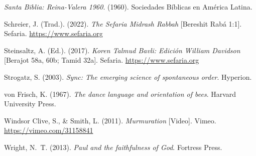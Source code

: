 \documentclass[11pt,letterpaper]{article}
\newcommand{\refapa}[1]{\par{\RaggedRight\hangindent=1.27cm\hangafter=1\noindent #1\par}\vspace{4pt}}
\begin{document}
\refapa{\emph{Santa Biblia: Reina-Valera 1960}. (1960). Sociedades Bíblicas en América Latina.}
\refapa{Schreier, J. (Trad.). (2022). \emph{The Sefaria Midrash Rabbah} [Bereshit Rabá 1:1]. Sefaria. \url{https://www.sefaria.org}}
\refapa{Steinsaltz, A. (Ed.). (2017). \emph{Koren Talmud Bavli: Edición William Davidson} [Berajot 58a, 60b; Tamid 32a]. Sefaria. \url{https://www.sefaria.org}}
\refapa{Strogatz, S. (2003). \emph{Sync: The emerging science of spontaneous order}. Hyperion.}
\refapa{von Frisch, K. (1967). \emph{The dance language and orientation of bees}. Harvard University Press.}
\refapa{Windsor Clive, S., \& Smith, L. (2011). \emph{Murmuration} [Video]. Vimeo. \url{https://vimeo.com/31158841}}
\refapa{Wright, N.~T. (2013). \emph{Paul and the faithfulness of God}. Fortress Press.}
\end{document}
